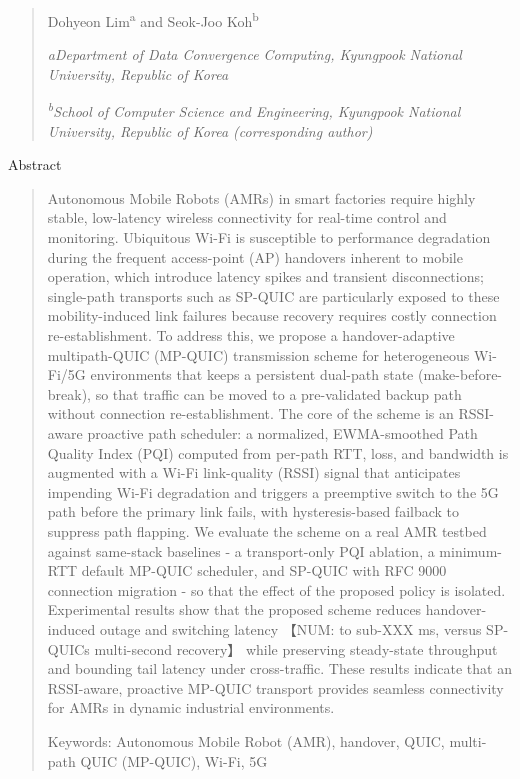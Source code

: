 \begin{quote}
Dohyeon Lim\textsuperscript{a} and Seok-Joo Koh\textsuperscript{b}

\emph{aDepartment of Data Convergence Computing, Kyungpook National University, Republic of Korea}

\emph{\textsuperscript{b}School of Computer Science and Engineering, Kyungpook National University, Republic of Korea (corresponding author)}
\end{quote}

Abstract

\begin{quote}
Autonomous Mobile Robots (AMRs) in smart factories require highly stable, low-latency wireless connectivity for real-time control and monitoring. Ubiquitous Wi-Fi is susceptible to performance degradation during the frequent access-point (AP) handovers inherent to mobile operation, which introduce latency spikes and transient disconnections; single-path transports such as SP-QUIC are particularly exposed to these mobility-induced link failures because recovery requires costly connection re-establishment. To address this, we propose a handover-adaptive multipath-QUIC (MP-QUIC) transmission scheme for heterogeneous Wi-Fi/5G environments that keeps a persistent dual-path state (make-before-break), so that traffic can be moved to a pre-validated backup path without connection re-establishment. The core of the scheme is an RSSI-aware proactive path scheduler: a normalized, EWMA-smoothed Path Quality Index (PQI) computed from per-path RTT, loss, and bandwidth is augmented with a Wi-Fi link-quality (RSSI) signal that anticipates impending Wi-Fi degradation and triggers a preemptive switch to the 5G path before the primary link fails, with hysteresis-based failback to suppress path flapping. We evaluate the scheme on a real AMR testbed against same-stack baselines - a transport-only PQI ablation, a minimum-RTT default MP-QUIC scheduler, and SP-QUIC with RFC 9000 connection migration - so that the effect of the proposed policy is isolated. Experimental results show that the proposed scheme reduces handover-induced outage and switching latency 【NUM: to sub-XXX ms, versus SP-QUIC\textquotesingle s multi-second recovery】 while preserving steady-state throughput and bounding tail latency under cross-traffic. These results indicate that an RSSI-aware, proactive MP-QUIC transport provides seamless connectivity for AMRs in dynamic industrial environments.

Keywords: Autonomous Mobile Robot (AMR), handover, QUIC, multi-path QUIC (MP-QUIC), Wi-Fi, 5G
\end{quote}

